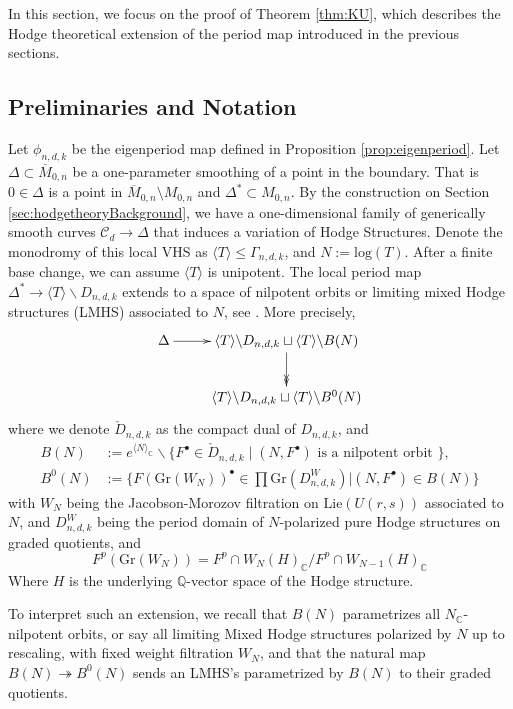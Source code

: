 \documentclass[12pt, letterpaper]{amsart}
\theoremstyle{plain}
\theoremstyle{definition}
\begin{document}
In this section, we focus on the proof of Theorem \ref{thm:KU},
which describes the Hodge theoretical extension of the period map introduced in the previous sections. 

\subsection{Preliminaries and Notation}
Let $\phi_{n,d,k}$ be the eigenperiod map defined in Proposition
\ref{prop:eigenperiod}. 
Let $\Delta \subset \overline{M}_{0,n}$ be a one-parameter smoothing of a point in the boundary. That is $0 \in \Delta$ is a point in $\overline{M}_{0,n} \setminus M_{0,n}$ and  $\Delta^*\subset M_{0,n}$. By the construction on Section \ref{sec:hodgetheoryBackground}, we have a one-dimensional family of generically smooth curves $\mathcal{C}_d \to \Delta$ that 
induces a variation of Hodge Structures. Denote the monodromy of this local VHS as $\langle T \rangle \leq \Gamma_{n,d,k}$, and $N:= \mathrm{log}(T)$.  After a finite base change, we can assume $\langle T\rangle$ is unipotent. 
The local period map $\Delta^* \to  \langle T\rangle \backslash D_{n,d,k} $  extends to a space of nilpotent orbits or limiting mixed Hodge structures (LMHS) associated to $N$, 
see \cite{KU08}. More precisely,
\begin{equation}
\xymatrix{
\Delta  \ar@{->}[r]  
&   \langle T\rangle \backslash D_{n,d,k} \sqcup \langle T\rangle \backslash B(N)
\ar@{->>}[d]
\\
&  \langle T\rangle \backslash D_{n,d,k} \sqcup \langle T\rangle \backslash B^0(N)
}
\end{equation}
where we denote $\check{D}_{n,d,k}$ as the compact dual of $D_{n,d,k}$, and
\begin{align*}
B(N) &
:=e^{\langle N\rangle_{\mathbb{C}}}\backslash \{F^{\bullet}\in \check{D}_{n,d,k} \;|\;(N,F^{\bullet}) \text { is a nilpotent orbit } \},
\\    
B^0(N) &:=\{F(\mathrm{Gr}(W_N))^{\bullet}\in \prod \mathrm{Gr}(D^W_{n,d,k})|(N, F^{\bullet})\in B(N)\}
\end{align*}
with $W_N$ being the Jacobson-Morozov filtration on $\mathrm{Lie}(U(r,s))$ associated to $N$, and $D^W_{n,d,k}$ being the period domain of $N$-polarized pure Hodge structures on graded quotients, and
\[
F^p(\mathrm{Gr}(W_N )) = F^p\cap W_N(H)_{\mathbb C}/F^p\cap W_{N-1}(H)_{\mathbb C}
\]
Where $H$ is the underlying $\mathbb{Q}$-vector space of the Hodge structure.

To interpret such an extension, we recall that 
$B(N)$ parametrizes all $N_{\mathbb{C}}$-nilpotent orbits, or say all limiting Mixed Hodge structures polarized by $N$ up to rescaling, with fixed weight filtration $W_N$, and that the natural map $B(N)\twoheadrightarrow B^0(N)$
sends an LMHS's parametrized by $B(N)$ to their graded quotients. 
\end{document}
